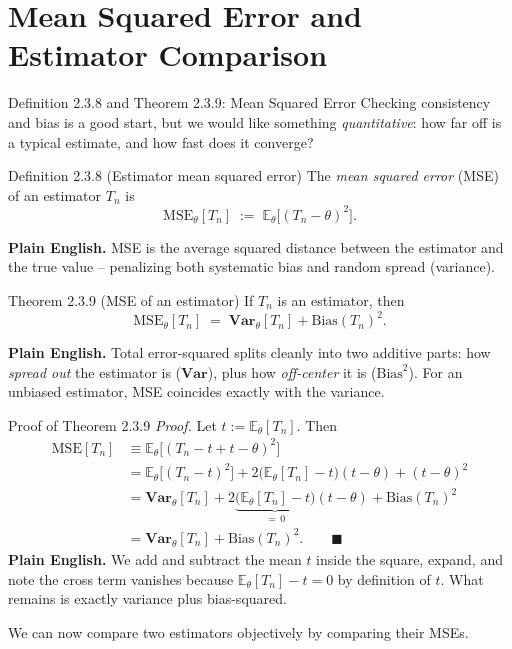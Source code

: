 \documentclass[aspectratio=169,10pt]{beamer}
\begin{document}
\section{Mean Squared Error and Estimator Comparison}

\begin{frame}{Definition 2.3.8 and Theorem 2.3.9: Mean Squared Error}
  Checking consistency and bias is a good start, but we would like something
  \emph{quantitative}: how far off is a typical estimate, and how fast does
  it converge?

  \begin{block}{Definition 2.3.8 (Estimator mean squared error)}
    The \emph{mean squared error} (MSE) of an estimator $T_n$ is
    \[
      \mathrm{MSE}_\theta[T_n] \;:=\; \mathbb{E}_\theta\big[(T_n-\theta)^2\big].
    \]
  \end{block}
  \textbf{Plain English.} MSE is the average squared distance between the
  estimator and the true value -- penalizing both systematic bias and
  random spread (variance).

  \begin{block}{Theorem 2.3.9 (MSE of an estimator)}
    If $T_n$ is an estimator, then
    \[
      \mathrm{MSE}_\theta[T_n] \;=\; \mathbf{Var}_\theta[T_n] + \mathrm{Bias}(T_n)^2.
    \]
  \end{block}
  \textbf{Plain English.} Total error-squared splits cleanly into two
  additive parts: how \emph{spread out} the estimator is ($\mathbf{Var}$),
  plus how \emph{off-center} it is ($\mathrm{Bias}^2$). For an unbiased
  estimator, MSE coincides exactly with the variance.
\end{frame}

\begin{frame}{Proof of Theorem 2.3.9}
  \textit{Proof.} Let $t := \mathbb{E}_\theta[T_n]$. Then
  \begin{align*}
    \mathrm{MSE}[T_n] &\equiv \mathbb{E}_\theta\big[(T_n - t + t - \theta)^2\big] \\
    &= \mathbb{E}_\theta\big[(T_n-t)^2\big] + 2\big(\mathbb{E}_\theta[T_n]-t\big)(t-\theta) + (t-\theta)^2 \\
    &= \mathbf{Var}_\theta[T_n] + 2\underbrace{\big(\mathbb{E}_\theta[T_n]-t\big)}_{=\,0}(t-\theta) + \mathrm{Bias}(T_n)^2 \\
    &= \mathbf{Var}_\theta[T_n] + \mathrm{Bias}(T_n)^2. \qquad \blacksquare
  \end{align*}
  \textbf{Plain English.} We add and subtract the mean $t$ inside the
  square, expand, and note the cross term vanishes because
  $\mathbb{E}_\theta[T_n]-t = 0$ by definition of $t$. What remains is
  exactly variance plus bias-squared.

  We can now compare two estimators objectively by comparing their MSEs.
\end{frame}
\end{document}
